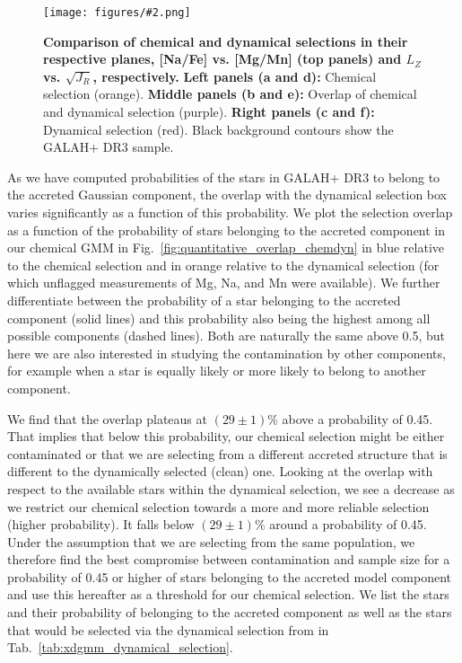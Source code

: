 \documentclass[fleqn,usenatbib]{mnras}
\newcommand{\codeicon}{{\faCloudDownload}}
\newcommand{\codelink}[1]{\href{https://github.com/svenbuder/Accreted-stars-in-GALAH-DR3/tree/main/figures/#1.ipynb}{\codeicon}\,\,}
\newcommand{\oscaption}[2]{\caption{#2 \codelink{#1}}}
\newcommand{\figuretextwidth}[4]{\begin{figure*} \centering \texttt{[image: figures/\#2.png]}\oscaption{#3}{#4}\label{fig:#2} \end{figure*}}
\begin{document}
\figuretextwidth{17cm}{chemdyn_selection_plane}{chronochemodynamic_comparison}{
\textbf{Comparison of chemical and dynamical selections in their respective planes, [Na/Fe] vs. [Mg/Mn] (top panels) and $L_Z$ vs. $\sqrt{J_R}$, respectively.}
\textbf{Left panels (a and d):} Chemical selection (orange).
\textbf{Middle panels (b and e):} Overlap of chemical and dynamical selection (purple).
\textbf{Right panels (c and f):} Dynamical selection (red).
Black background contours show the GALAH+ DR3 sample.
}


As we have computed probabilities of the stars in GALAH+ DR3 to belong to the accreted Gaussian component, the overlap with the dynamical selection box varies significantly as a function of this probability. We plot the selection overlap as a function of the probability of stars belonging to the accreted component in our chemical GMM in Fig.~\ref{fig:quantitative_overlap_chemdyn} in blue relative to the chemical selection and in orange relative to the dynamical selection (for which unflagged measurements of Mg, Na, and Mn were available). We further differentiate between the probability of a star belonging to the accreted component (solid lines) and this probability also being the highest among all possible components (dashed lines). Both are naturally the same above 0.5, but here we are also interested in studying the contamination by other components, for example when a star is equally likely or more likely to belong to another component. 

We find that the overlap plateaus at $(29\pm1)\%$ above a probability of 0.45. That implies that below this probability, our chemical selection might be either contaminated or that we are selecting from a different accreted structure that is different to the dynamically selected (clean) one. Looking at the overlap with respect to the available stars within the dynamical selection, we see a decrease as we restrict our chemical selection towards a more and more reliable selection (higher probability). It falls below $(29\pm1)\%$ around a probability of 0.45. Under the assumption that we are selecting from the same population, we therefore find the best compromise between contamination and sample size for a probability of 0.45 or higher of stars belonging to the accreted model component and use this hereafter as a threshold for our chemical selection. We list the stars and their probability of belonging to the accreted component as well as the stars that would be selected via the dynamical selection from \citet{Feuillet2021} in Tab.~\ref{tab:xdgmm_dynamical_selection}.
\end{document}
